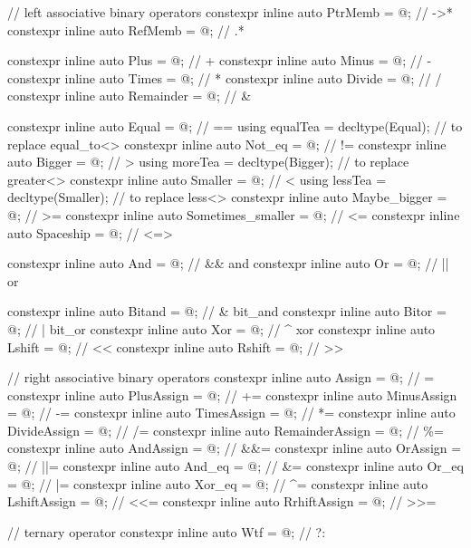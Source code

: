 \documentclass[ebook,11pt,article]{memoir}
\begin{document}
{\begin{addedblock}
\begin{codeblock}
 
  // left associative binary operators
  constexpr inline auto PtrMemb = @\seebelow@ ; // ->*
  constexpr inline auto RefMemb = @\seebelow@ ; // .*
  
  constexpr inline auto Plus = @\seebelow@ ; // +
  constexpr inline auto Minus = @\seebelow@ ; // -
  constexpr inline auto Times = @\seebelow@ ; // *
  constexpr inline auto Divide = @\seebelow@ ; // /
  constexpr inline auto Remainder = @\seebelow@ ; // \&
  
  constexpr inline auto Equal = @\seebelow@ ; // ==
  using equalTea = decltype(Equal); // to replace equal_to<>
  constexpr inline auto Not_eq = @\seebelow@ ; // !=
  constexpr inline auto Bigger = @\seebelow@ ; // >
  using moreTea = decltype(Bigger); // to replace greater<>
  constexpr inline auto Smaller = @\seebelow@ ; // <
  using lessTea = decltype(Smaller); // to replace less<>
  constexpr inline auto Maybe_bigger = @\seebelow@ ; // >=
  constexpr inline auto Sometimes_smaller = @\seebelow@ ; // <=
  constexpr inline auto Spaceship = @\seebelow@ ; // <=>

  constexpr inline auto And = @\seebelow@ ; // \&\& and
  constexpr inline auto Or = @\seebelow@ ; // || or

  constexpr inline auto Bitand = @\seebelow@ ; // \& bit_and
  constexpr inline auto Bitor = @\seebelow@ ; // | bit_or
  constexpr inline auto Xor = @\seebelow@ ; // \^{} xor
  constexpr inline auto Lshift = @\seebelow@ ; // <{}<
  constexpr inline auto Rshift = @\seebelow@ ; // >{}>
  
  // right associative binary operators
  constexpr inline auto Assign = @\seebelow@ ; // =
  constexpr inline auto PlusAssign = @\seebelow@ ; // +=
  constexpr inline auto MinusAssign = @\seebelow@ ; // -=
  constexpr inline auto TimesAssign = @\seebelow@ ; // *=
  constexpr inline auto DivideAssign = @\seebelow@ ; // /=
  constexpr inline auto RemainderAssign = @\seebelow@ ; // \%=
  constexpr inline auto AndAssign = @\seebelow@ ; // \&\&=
  constexpr inline auto OrAssign = @\seebelow@ ; // ||=
  constexpr inline auto And_eq = @\seebelow@ ; // \&=
  constexpr inline auto Or_eq = @\seebelow@ ; // |=
  constexpr inline auto Xor_eq = @\seebelow@ ; // \^{}=
  constexpr inline auto LshiftAssign = @\seebelow@ ; // <{}<=
  constexpr inline auto RrhiftAssign = @\seebelow@ ; // >{}>=
  
  // ternary operator
  constexpr inline auto Wtf = @\seebelow@ ; // ?:

  
  

\end{codeblock}
\end{addedblock}}
\end{document}
